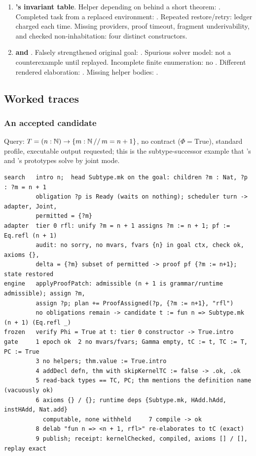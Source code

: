\begin{enumerate}
\item \textbf{'s invariant table}. Helper depending on  behind a short theorem: . Completed task from a replaced environment: . Repeated restore/retry: ledger charged each time. Missing providers, proof timeout, fragment underivability, and checked non-inhabitation: four distinct constructors.
\item \textbf{ and }. Falsely strengthened original goal: . Spurious solver model: not a counterexample until replayed. Incomplete finite enumeration: no . Different rendered elaboration: . Missing helper bodies: .
\end{enumerate}

\subsection{Worked traces}\label{alg:acc-traces}

\subsubsection{An accepted candidate}

Query: $T = (n : \mathbb{N}) \to \{m : \mathbb{N} \,//\, m = n + 1\}$, no contract ($\Phi = \mathrm{True}$), standard profile, executable output requested; this is the subtype-successor example that 's and 's prototypes solve by joint mode.
\begin{lstlisting}
search   intro n;  head Subtype.mk on the goal: children ?m : Nat, ?p : ?m = n + 1
         obligation ?p is Ready (waits on nothing); scheduler turn -> adapter, Joint,
         permitted = {?m}
adapter  tier 0 rfl: unify ?m = n + 1 assigns ?m := n + 1; pf := Eq.refl (n + 1)
         audit: no sorry, no mvars, fvars {n} in goal ctx, check ok, axioms {},
         delta = {?m} subset of permitted -> proof pf {?m := n+1}; state restored
engine   applyProofPatch: admissible (n + 1 is grammar/runtime admissible); assign ?m,
         assign ?p; plan += ProofAssigned(?p, {?m := n+1}, "rfl")
         no obligations remain -> candidate t := fun n => Subtype.mk (n + 1) (Eq.refl _)
frozen   verify Phi = True at t: tier 0 constructor -> True.intro
gate     1 epoch ok  2 no mvars/fvars; Gamma empty, tC := t, TC := T, PC := True
         3 no helpers; thm.value := True.intro
         4 addDecl defn, thm with skipKernelTC := false -> .ok, .ok
         5 read-back types == TC, PC; thm mentions the definition name (vacuously ok)
         6 axioms {} / {}; runtime deps {Subtype.mk, HAdd.hAdd, instHAdd, Nat.add}
           computable, none withheld     7 compile -> ok
         8 delab "fun n => <n + 1, rfl>" re-elaborates to tC (exact)
         9 publish; receipt: kernelChecked, compiled, axioms [] / [], replay exact
\end{lstlisting}

